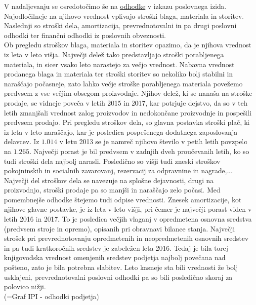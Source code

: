 \documentclass[12pt,a4paper]{amsart}
\theoremstyle{definition} %
\theoremstyle{plain} %
\begin{document}
V nadaljevanju se osredotočimo še na \underline{odhodke} v izkazu poslovnega izida. Najodločilneje na njihovo vrednost vplivajo stroški blaga, materiala in storitev. Naslednji so stroški dela, amortizacija, prevrednotovalni in pa drugi poslovni odhodki ter finančni odhodki iz poslovnih obveznosti.\\ Ob pregledu stroškov blaga, materiala in storitev opazimo, da je njihova vrednost iz leta v leto višja. Največji delež tako predstavljajo stroški porabljenega materiala, in sicer vsako leto narastejo za večjo vrednost. Nabavna vrednost prodanega blaga in materiala ter stroški storitev so nekoliko bolj stabilni in naraščajo počasneje, zato lahko večje stroške porabljenega materiala povežemo predvsem z vse večjim obsegom proizvodnje. Njihov delež, ki se nanaša na stroške prodaje, se vidneje poveča v letih 2015 in 2017, kar potrjuje dejstvo, da so v teh letih zmanjšali vrednost zalog proizvodov in nedokončane proizvodnje in pospešili predvsem prodajo. %
Pri pregledu stroškov dela, so glavna postavka stroški plač, ki iz leta v leto naraščajo, kar je posledica pospešenega dodatnega zaposlovanja delavcev. Iz $1.014$ v letu 2013 se je namreč njihovo število v petih letih povzpelo na $1.265$. Največji porast je bil predvsem v zadnjih dveh proučevanih letih, ko so tudi stroški dela najbolj narasli. Posledično so višji tudi zneski stroškov pokojninskih in socialnih zavarovanj, rezervacij za odpravnine in nagrade,... Največji del stroškov dela se navezuje na splošne dejavnosti, drugi na proizvodnjo, stroški prodaje pa so manjši in naraščajo zelo počasi. Med pomembnejše odhodke štejemo tudi odpise vrednosti. Znesek amortizacije, kot njihove glavne postavke, je iz leta v leto višji, pri čemer je največji porast viden v letih 2016 in 2017. To je posledica večjih vlaganj v opredmetena osnovna sredstva (predvsem stroje in opremo), opisanih pri obravnavi bilance stanja. Največji strošek pri prevrednotovanju opredmetenih in neopredmetenih osnovnih sredstev in pa tudi kratkoročnih sredstev je zabeležen leta 2016. Tedaj je bila torej knjigovodska vrednost omenjenih sredstev podjetja najbolj povečana nad pošteno, zato je bila potrebna slabitev. Leto kasneje sta bili vrednosti že bolj usklajeni, prevrednotovalni poslovni odhodki pa so bili posledično skoraj za polovico nižji.\\
(=Graf IPI - odhodki podjetja)\\
\end{document}
